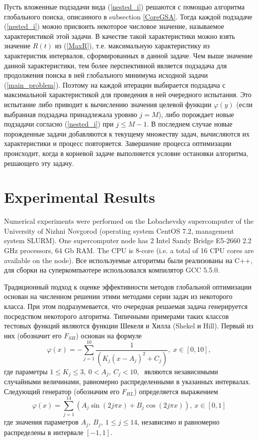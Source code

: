 \documentclass[entropy,article,submit,moreauthors,pdftex]{Definitions/mdpi}
\begin{document}
Пусть вложенные подзадачи вида (\ref{nested_i}) решаются с помощью алгоритма глобального поиска, описанного в subsection \ref{CoreGSA}. Тогда каждой подзадаче (\ref{nested_i}) можно присвоить некоторое числовое значение, называемое характеристикой этой задачи. В качестве такой характеристики можно взять значение $R(t)$ из (\ref{MaxR}), т.е. максимальную характеристику из характеристик интервалов, сформированных в данной задаче. Чем выше значение данной характеристики, тем более перспективной является подзадача для продолжения поиска в ней глобального минимума исходной задачи (\ref{main_problem}). Поэтому на каждой итерации выбирается подзадача с максимальной характеристикой для проведения в ней очередного испытания. Это испытание либо приводит к вычислению значения целевой функции $\varphi(y)$ (если выбранная подзадача принадлежала уровню $j=M$), либо порождает новые подзадачи согласно (\ref{nested_i}) при $j\leq M-1$. В последнем случае новые порожденные задачи добавляются к текущему множеству задач, вычисляются их характеристики и процесс повторяется. Завершение процесса оптимизации происходит, когда в корневой задаче выполняется условие остановки алгоритма, решающего эту задачу.



\section{Experimental Results}

Numerical experiments were performed on the Lobachevsky supercomputer of the University of Nizhni Novgorod (operating system CentOS 7.2, management system SLURM). One supercomputer node has 2 Intel Sandy Bridge E5-2660 2.2 GHz processors, 64 Gb RAM. The CPU is 8-core (i.e. a total of 16 CPU cores are available on the node). Все используемые алгоритмы были реализованы на C++, для сборки на суперкомпьютере использовался компилятор GCC 5.5.0.

Традиционный подход к оценке эффективности методов глобальной оптимизации основан на численном решении этими методами серии задач из некоторого класса. 
При этом подразумевается, что очередная решаемая задача генерируется посредством некоторого алгоритма.
Типичными примерами таких классов тестовых функций являются функции Шекеля и Хилла (Shekel и Hill). 
Первый из них (обозначит его $F_{SH}$) основан на формуле 
\begin{equation}\label{shekel}
  \varphi(x)=-\sum_{j=1}^{10}\frac{1}{(K_j(x-A_j)^2+C_j)},\;  x\in[0,10],
\end{equation}
где параметры $1\le K_j\le 3,\: 0 < A_j,\: C_j < 10, \;$ являются независимыми случайными величинами, равномерно распределенными в указанных интервалах.
Следующий генератор (обозначим его $F_{HL}$) определяется выражением
\begin{equation}\label{hill}
  \varphi(x)=\sum_{j=1}^{14}(A_j\sin(2j\pi x) + B_j\cos(2j\pi x)),\: x\in[0,1]
\end{equation}
где значения параметров  $A_j,\: B_j,\: 1 \le j \le 14$, независимо и равномерно распределены в интервале $[-1,1]$. 
\end{document}
